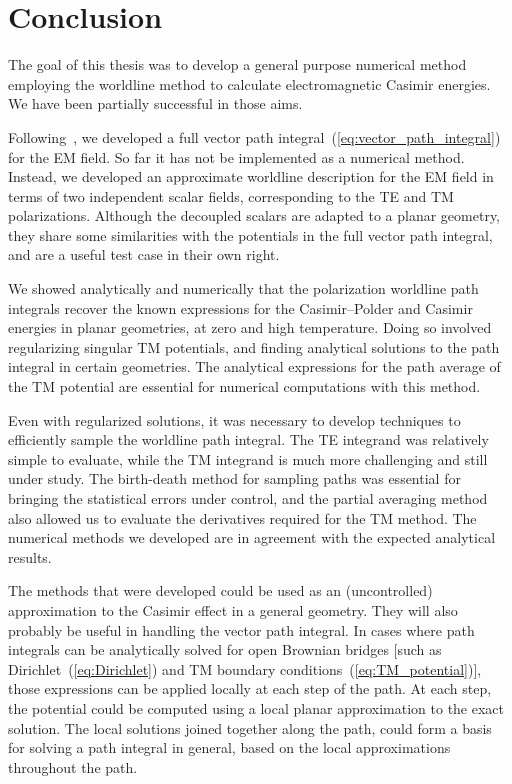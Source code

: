 \chapter{Conclusion}

The goal of this thesis was to develop a general purpose numerical method
employing the worldline method to calculate electromagnetic Casimir energies. 
We have been partially successful in those aims.   

Following~\citet{Bordag1998,Bordag1999}, we developed a full vector path integral~(\ref{eq:vector_path_integral}) for
the EM field.  So far it has not be implemented as a numerical method.
Instead, we developed an approximate worldline description for the EM field in terms of two independent scalar fields, corresponding 
to the TE and TM polarizations.   
Although the decoupled scalars are adapted to a planar geometry, 
they share some similarities with the potentials in the full vector
path integral, and are a useful test case in their own right.  

We showed analytically and numerically that the polarization worldline path integrals recover the known expressions for the 
Casimir--Polder and Casimir energies in planar geometries, at zero and high temperature.  
Doing so involved regularizing singular TM potentials, and finding analytical solutions to the path integral
in certain geometries.  The analytical expressions for the path average of the TM potential are 
 essential for numerical computations with this method.  

Even with regularized solutions, it was necessary to develop techniques to efficiently
sample the worldline path integral.  The TE integrand was relatively simple to evaluate, while the TM
integrand is much more challenging and still under study.
The birth-death method for sampling paths was essential for bringing the statistical errors under control, 
and the partial averaging method also allowed us to evaluate the derivatives required for the TM method.
The numerical methods we developed are in agreement with the expected analytical results.

The methods that were developed could be used as an (uncontrolled) approximation to the Casimir effect in a general geometry.
They will also probably be useful in handling the vector path integral.    
In cases where path integrals can be analytically solved for open Brownian bridges [such as
Dirichlet~(\ref{eq:Dirichlet}) and TM boundary conditions~(\ref{eq:TM_potential})], 
those expressions can be applied locally at each step of the path.  
At each step, the potential could be computed using a local planar approximation to the exact solution.
The local solutions joined together along the path, could form a basis for solving a path integral
in general, based on the local approximations throughout the path.  

